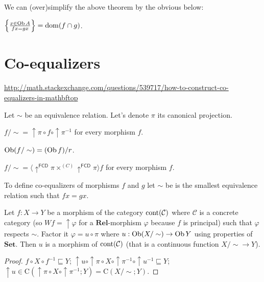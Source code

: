 We can (over)simplify the above theorem by the obvious below:

\begin{obvious}
$\left\{ \frac{ x \in \operatorname{Ob} A }{ f x = g x }\right\} = \operatorname{dom} (f \cap g)$.
\end{obvious}

\section{Co-equalizers}

\url{http://math.stackexchange.com/questions/539717/how-to-construct-co-equalizers-in-mathbftop}	

Let $\sim$ be an equivalence relation. Let's denote $\pi$ its canonical
projection.

\begin{defn}
  $f / \sim = \uparrow \pi \circ f \circ \uparrow \pi^{- 1}$ for every
  morphism $f$.
\end{defn}

\begin{obvious}
$\operatorname{Ob} (f / \sim) = (\operatorname{Ob} f) / r$.
\end{obvious}

\begin{obvious}
$f / \sim = \langle \uparrow^{\mathsf{FCD}} \pi \times^{(C)}
\uparrow^{\mathsf{FCD}} \pi \rangle f$ for every morphism
$f$.
\end{obvious}

To define co-equalizers of morphisms $f$ and $g$ let $\sim$ be is the smallest
equivalence relation such that $f x = g x$.

\begin{lem}
  Let $f : X \rightarrow Y$ be a morphism of the category
  $\operatorname{cont} (\mathcal{C})$ where $\mathcal{C}$ is a concrete
  category (so $W f = \uparrow \varphi$ for a $\mathbf{Rel}$-morphism
  $\varphi$ because $f$ is principal) such that $\varphi$ respects $\sim$.
  Factor it $\varphi = u \circ \pi$ where $u : \operatorname{Ob} (X / \sim)
  \rightarrow \operatorname{Ob} Y$ using properties of $\mathbf{Set}$. Then
  $u$ is a morphism of $\operatorname{cont} (\mathcal{C})$ (that is a
  continuous function $X / \sim \rightarrow Y$).
\end{lem}

\begin{proof}
  $f \circ X \circ f^{- 1} \sqsubseteq Y$; $\uparrow u \circ \uparrow \pi
  \circ X \circ \uparrow \pi^{- 1} \circ \uparrow u^{- 1} \sqsubseteq Y$;
  $\uparrow u \in \mathrm{C} (\uparrow \pi \circ X \circ \uparrow \pi^{- 1} ;
  Y) = \mathrm{C} (X / \sim ; Y)$.
\end{proof}

